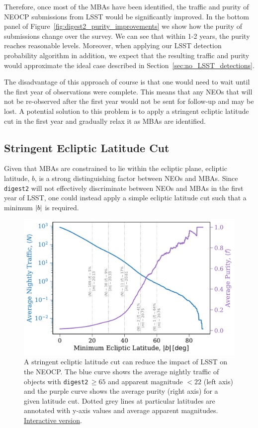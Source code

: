 \documentclass[twocolumn]{aastex631}
\newcommand{\dig}{\texttt{digest2}}
\begin{document}
Therefore, once most of the MBAs have been identified, the traffic and purity of NEOCP submissions from LSST would be significantly improved. In the bottom panel of Figure~\ref{fig:digest2_purity_improvements} we show how the purity of submissions change over the survey. We can see that within 1-2 years, the purity reaches reasonable levels. Moreover, when applying our LSST detection probability algorithm in addition, we expect that the resulting traffic and purity would approximate the ideal case described in Section~\ref{sec:no_LSST_detections}.

The disadvantage of this approach of course is that one would need to wait until the first year of observations were complete. This means that any NEOs that will not be re-observed after the first year would not be sent for follow-up and may be lost. A potential solution to this problem is to apply a stringent ecliptic latitude cut in the first year and gradually relax it as MBAs are identified.

\subsection{Stringent Ecliptic Latitude Cut}\label{sec:ecl_lat}
Given that MBAs are constrained to lie within the ecliptic plane, ecliptic latitude, $b$, is a strong distinguishing factor between NEOs and MBAs. Since \dig{} will not effectively discriminate between NEOs and MBAs in the first year of LSST, one could instead apply a simple ecliptic latitude cut such that a minimum $\abs{b}$ is required.

\begin{figure}[tb]
    \centering
    \includegraphics[width=\columnwidth]{figures/ecliptic_latitude_cutoff.pdf}
    \caption{A stringent ecliptic latitude cut can reduce the impact of LSST on the NEOCP. The blue curve shows the average nightly traffic of objects with \dig{}$\,\ge 65$ and apparent magnitude $< 22$ (left axis) and the purple curve shows the average purity (right axis) for a given latitude cut. Dotted grey lines at particular latitudes are annotated with y-axis values and average apparent magnitudes. \href{https://www.tomwagg.com/html/interact/neocp_ecliptic_latitude.html}{Interactive version}.}
    \label{fig:ecl_lat_cutoff}
\end{figure}
\end{document}
